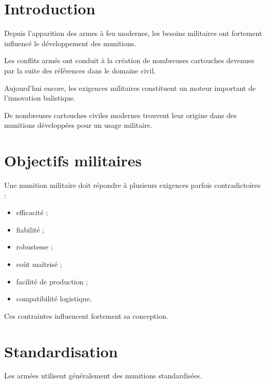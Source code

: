 
\section{Introduction}

Depuis l'apparition des armes à feu modernes, les besoins militaires ont
fortement influencé le développement des munitions.

Les conflits armés ont conduit à la création de nombreuses cartouches devenues
par la suite des références dans le domaine civil.

Aujourd'hui encore, les exigences militaires constituent un moteur important
de l'innovation balistique.

\begin{aretenir}

De nombreuses cartouches civiles modernes trouvent leur origine dans des
munitions développées pour un usage militaire.

\end{aretenir}

\section{Objectifs militaires}

Une munition militaire doit répondre à plusieurs exigences parfois
contradictoires :

\begin{itemize}
    \item efficacité ;
    \item fiabilité ;
    \item robustesse ;
    \item coût maîtrisé ;
    \item facilité de production ;
    \item compatibilité logistique.
\end{itemize}

Ces contraintes influencent fortement sa conception.

\section{Standardisation}

Les armées utilisent généralement des munitions standardisées.

